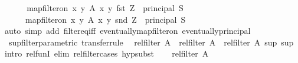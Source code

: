 \begin{isabellebody}
\ \ \isamarkupfalse%
\ \isamarkupfalse%
\ {\isachardoublequoteopen}map{\isacharunderscore}{\kern0pt}filter{\isacharunderscore}{\kern0pt}on\ {\isacharbraceleft}{\kern0pt}{\isacharparenleft}{\kern0pt}x{\isacharcomma}{\kern0pt}\ y{\isacharparenright}{\kern0pt}{\isachardot}{\kern0pt}\ A\ x\ y{\isacharbraceright}{\kern0pt}\ fst\ {\isacharquery}{\kern0pt}Z\ {\isacharequal}{\kern0pt}\ principal\ S{\isachardoublequoteclose}\isanewline
\ \ \ \ \ {\isachardoublequoteopen}map{\isacharunderscore}{\kern0pt}filter{\isacharunderscore}{\kern0pt}on\ {\isacharbraceleft}{\kern0pt}{\isacharparenleft}{\kern0pt}x{\isacharcomma}{\kern0pt}\ y{\isacharparenright}{\kern0pt}{\isachardot}{\kern0pt}\ A\ x\ y{\isacharbraceright}{\kern0pt}\ snd\ {\isacharquery}{\kern0pt}Z\ {\isacharequal}{\kern0pt}\ principal\ S{\isacharprime}{\kern0pt}{\isachardoublequoteclose}\isanewline
\ \ \ \ \isamarkupfalse%
{\isacharparenleft}{\kern0pt}auto\ simp\ add{\isacharcolon}{\kern0pt}\ filter{\isacharunderscore}{\kern0pt}eq{\isacharunderscore}{\kern0pt}iff\ eventually{\isacharunderscore}{\kern0pt}map{\isacharunderscore}{\kern0pt}filter{\isacharunderscore}{\kern0pt}on\ eventually{\isacharunderscore}{\kern0pt}principal{\isacharparenright}{\kern0pt}\isanewline
{}\isamarkupfalse%
%
\endisatagproof
{\isafoldproof}%
%
\isadelimproof
\isanewline
%
\endisadelimproof
\isanewline
{}\isamarkupfalse%
\ sup{\isacharunderscore}{\kern0pt}filter{\isacharunderscore}{\kern0pt}parametric\ {\isacharbrackleft}{\kern0pt}transfer{\isacharunderscore}{\kern0pt}rule{\isacharbrackright}{\kern0pt}{\isacharcolon}{\kern0pt}\isanewline
\ \ {\isachardoublequoteopen}{\isacharparenleft}{\kern0pt}rel{\isacharunderscore}{\kern0pt}filter\ A\ {\isacharequal}{\kern0pt}{\isacharequal}{\kern0pt}{\isacharequal}{\kern0pt}{\isachargreater}{\kern0pt}\ rel{\isacharunderscore}{\kern0pt}filter\ A\ {\isacharequal}{\kern0pt}{\isacharequal}{\kern0pt}{\isacharequal}{\kern0pt}{\isachargreater}{\kern0pt}\ rel{\isacharunderscore}{\kern0pt}filter\ A{\isacharparenright}{\kern0pt}\ sup\ sup{\isachardoublequoteclose}\isanewline
%
\isadelimproof
%
\endisadelimproof
%
\isatagproof
{}\isamarkupfalse%
{\isacharparenleft}{\kern0pt}intro\ rel{\isacharunderscore}{\kern0pt}funI{\isacharsemicolon}{\kern0pt}\ elim\ rel{\isacharunderscore}{\kern0pt}filter{\isachardot}{\kern0pt}cases{\isacharsemicolon}{\kern0pt}\ hypsubst{\isacharparenright}{\kern0pt}\isanewline
\ \ \isamarkupfalse%
\ {\isachardoublequoteopen}rel{\isacharunderscore}{\kern0pt}filter\ A\isanewline

\end{isabellebody}
